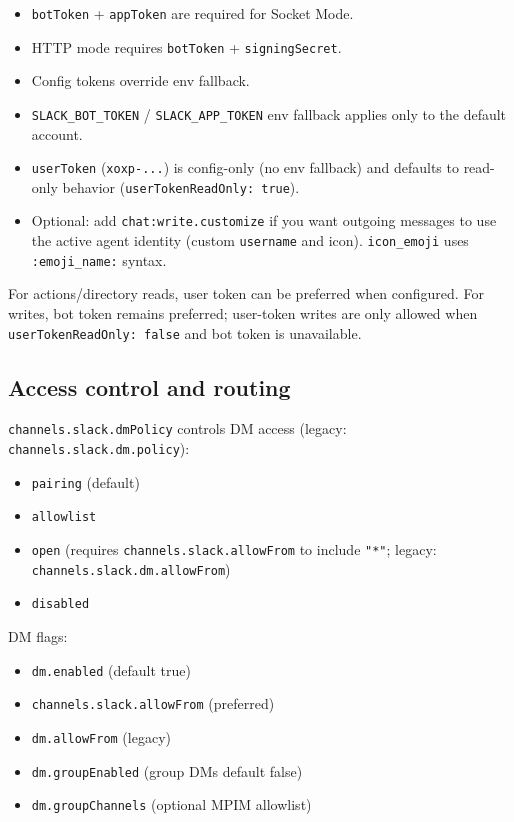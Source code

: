 \begin{itemize}
  \item \texttt{botToken} + \texttt{appToken} are required for Socket Mode.
  \item HTTP mode requires \texttt{botToken} + \texttt{signingSecret}.
  \item Config tokens override env fallback.
  \item \texttt{SLACK\_BOT\_TOKEN} / \texttt{SLACK\_APP\_TOKEN} env fallback applies only to the default account.
  \item \texttt{userToken} (\texttt{xoxp-...}) is config-only (no env fallback) and defaults to read-only behavior (\texttt{userTokenReadOnly: true}).
  \item Optional: add \texttt{chat:write.customize} if you want outgoing messages to use the active agent identity (custom \texttt{username} and icon). \texttt{icon\_emoji} uses \texttt{:emoji\_name:} syntax.
\end{itemize}


For actions/directory reads, user token can be preferred when configured. For writes, bot token remains preferred; user-token writes are only allowed when \texttt{userTokenReadOnly: false} and bot token is unavailable.

\subsection{Access control and routing}


\texttt{channels.slack.dmPolicy} controls DM access (legacy: \texttt{channels.slack.dm.policy}):

\begin{itemize}
  \item \texttt{pairing} (default)
  \item \texttt{allowlist}
  \item \texttt{open} (requires \texttt{channels.slack.allowFrom} to include \texttt{"*"}; legacy: \texttt{channels.slack.dm.allowFrom})
  \item \texttt{disabled}
\end{itemize}


DM flags:

\begin{itemize}
  \item \texttt{dm.enabled} (default true)
  \item \texttt{channels.slack.allowFrom} (preferred)
  \item \texttt{dm.allowFrom} (legacy)
  \item \texttt{dm.groupEnabled} (group DMs default false)
  \item \texttt{dm.groupChannels} (optional MPIM allowlist)
\end{itemize}



